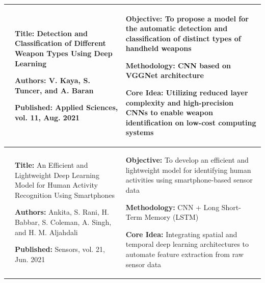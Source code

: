 \begin{longtable}{|>{\centering\arraybackslash}p{1.2cm}|p{6.3cm}|p{6.3cm}|}
  10 &
  \textbf{Title:} Detection and Classification of Different Weapon Types Using Deep Learning \par
  \textbf{Authors:} V. Kaya, S. Tuncer, and A. Baran \par
  \textbf{Published:} Applied Sciences, vol. 11, Aug. 2021 &
  \textbf{Objective:} To propose a model for the automatic detection and classification of distinct types of handheld weapons \par
  \textbf{Methodology:} CNN based on VGGNet architecture \par
  \textbf{Core Idea:} Utilizing reduced layer complexity and high-precision CNNs to enable weapon identification on low-cost computing systems \\
  \hline

  11 &
  \textbf{Title:} An Efficient and Lightweight Deep Learning Model for Human Activity Recognition Using Smartphones \par
  \textbf{Authors:} Ankita, S. Rani, H. Babbar, S. Coleman, A. Singh, and H. M. Aljahdali \par
  \textbf{Published:} Sensors, vol. 21, Jun. 2021 &
  \textbf{Objective:} To develop an efficient and lightweight model for identifying human activities using smartphone-based sensor data \par
  \textbf{Methodology:} CNN + Long Short-Term Memory (LSTM) \par
  \textbf{Core Idea:} Integrating spatial and temporal deep learning architectures to automate feature extraction from raw sensor data \\
  \hline
\end{longtable}
\label{end:comparison}
\label{end:literature}
